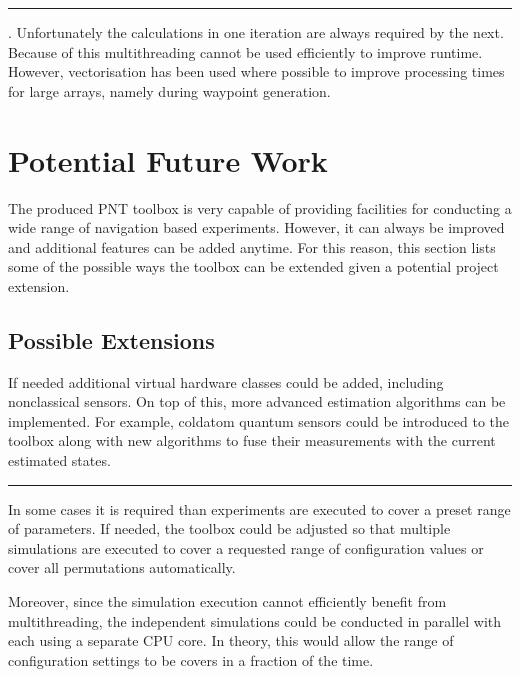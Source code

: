 \documentclass[letterpaper,10pt,english]{sphinxmanual}
\begin{document}
\bigskip\hrule\bigskip

\begin{description}
\sphinxAtStartPar
{}. Unfortunately the calculations in one iteration are always required by the next. Because of this
multi\sphinxhyphen{}threading cannot be used efficiently to improve runtime. However, vectorisation has been used where possible
to improve processing times for large arrays, namely during waypoint generation.

\end{description}

\sphinxstepscope


\section{Potential Future Work}
\label{\detokenize{usage/future:potential-future-work}}\label{\detokenize{usage/future::doc}}
\sphinxAtStartPar
The produced PNT toolbox is very capable of providing facilities for conducting a wide range of navigation based
experiments. However, it can always be improved and additional features can be added anytime. For this reason, this
section lists some of the possible ways the toolbox can be extended given a potential project extension.


\subsection{Possible Extensions}
\label{\detokenize{usage/future:possible-extensions}}\begin{description}
\sphinxAtStartPar
If needed additional virtual hardware classes could be added, including non\sphinxhyphen{}classical sensors. On top of this,
more advanced estimation algorithms can be implemented. For example, cold\sphinxhyphen{}atom quantum sensors could be introduced
to the toolbox along with new algorithms to fuse their measurements with the current estimated states.

\end{description}


\bigskip\hrule\bigskip

\begin{description}
\sphinxAtStartPar
In some cases it is required than experiments are executed to cover a pre\sphinxhyphen{}set range of parameters. If needed, the
toolbox could be adjusted so that multiple simulations are executed to cover a requested range of configuration
values or cover all permutations automatically.

\sphinxAtStartPar
Moreover, since the simulation execution cannot efficiently benefit from multithreading, the independent
simulations could be conducted in parallel with each using a separate CPU core. In theory, this would allow the
range of configuration settings to be covers in a fraction of the time.

\end{description}
\end{document}
